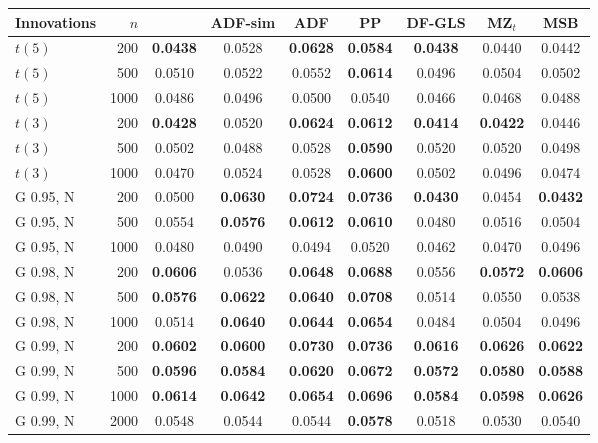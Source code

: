 \begin{tabular}{lrccccccc}
\toprule
Innovations & $n$ & \RMGLS{} & ADF-sim & ADF & PP & DF-GLS & MZ$_t$ & MSB \\
\midrule
$t(5)$ & 200 & \textbf{0.0438} & 0.0528 & \textbf{0.0628} & \textbf{0.0584} & \textbf{0.0438} & 0.0440 & 0.0442 \\
$t(5)$ & 500 & 0.0510 & 0.0522 & 0.0552 & \textbf{0.0614} & 0.0496 & 0.0504 & 0.0502 \\
$t(5)$ & 1000 & 0.0486 & 0.0496 & 0.0500 & 0.0540 & 0.0466 & 0.0468 & 0.0488 \\
$t(3)$ & 200 & \textbf{0.0428} & 0.0520 & \textbf{0.0624} & \textbf{0.0612} & \textbf{0.0414} & \textbf{0.0422} & 0.0446 \\
$t(3)$ & 500 & 0.0502 & 0.0488 & 0.0528 & \textbf{0.0590} & 0.0520 & 0.0520 & 0.0498 \\
$t(3)$ & 1000 & 0.0470 & 0.0524 & 0.0528 & \textbf{0.0600} & 0.0502 & 0.0496 & 0.0474 \\
G 0.95, N & 200 & 0.0500 & \textbf{0.0630} & \textbf{0.0724} & \textbf{0.0736} & \textbf{0.0430} & 0.0454 & \textbf{0.0432} \\
G 0.95, N & 500 & 0.0554 & \textbf{0.0576} & \textbf{0.0612} & \textbf{0.0610} & 0.0480 & 0.0516 & 0.0504 \\
G 0.95, N & 1000 & 0.0480 & 0.0490 & 0.0494 & 0.0520 & 0.0462 & 0.0470 & 0.0496 \\
G 0.98, N & 200 & \textbf{0.0606} & 0.0536 & \textbf{0.0648} & \textbf{0.0688} & 0.0556 & \textbf{0.0572} & \textbf{0.0606} \\
G 0.98, N & 500 & \textbf{0.0576} & \textbf{0.0622} & \textbf{0.0640} & \textbf{0.0708} & 0.0514 & 0.0550 & 0.0538 \\
G 0.98, N & 1000 & 0.0514 & \textbf{0.0640} & \textbf{0.0644} & \textbf{0.0654} & 0.0484 & 0.0504 & 0.0496 \\
G 0.99, N & 200 & \textbf{0.0602} & \textbf{0.0600} & \textbf{0.0730} & \textbf{0.0736} & \textbf{0.0616} & \textbf{0.0626} & \textbf{0.0622} \\
G 0.99, N & 500 & \textbf{0.0596} & \textbf{0.0584} & \textbf{0.0620} & \textbf{0.0672} & \textbf{0.0572} & \textbf{0.0580} & \textbf{0.0588} \\
G 0.99, N & 1000 & \textbf{0.0614} & \textbf{0.0642} & \textbf{0.0654} & \textbf{0.0696} & \textbf{0.0584} & \textbf{0.0598} & \textbf{0.0626} \\
G 0.99, N & 2000 & 0.0548 & 0.0544 & 0.0544 & \textbf{0.0578} & 0.0518 & 0.0530 & 0.0540 \\

\end{tabular}
